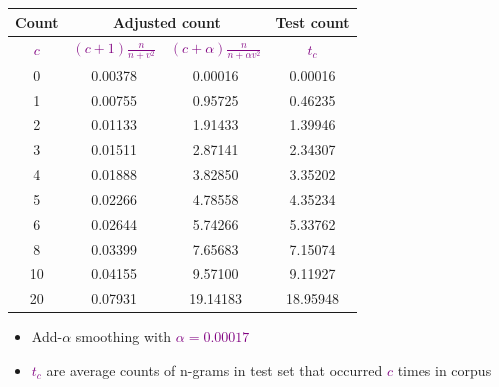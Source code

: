 \documentclass[landscape]{slides}
\newcommand{\maths}[1]{\textcolor{purple}{#1}}
\begin{document}
\vspace{5mm}
\begin{center}
\begin{tabular}{|c|c|c|c|} \hline
\bf Count & \multicolumn{2}{c|}{\bf Adjusted count} & \bf Test count \\ \hline
\maths{$c$} & \maths{$(c+1)\frac{n}{n+v^2}$} & \maths{$(c+\alpha)\frac{n}{n+\alpha v^2}$} & \maths{$t_c$}\\ \hline
  0 &  0.00378 &  0.00016 & 0.00016\\ \hline
  1 &  0.00755 &  0.95725 & 0.46235\\ \hline
  2 &  0.01133 &  1.91433 & 1.39946\\ \hline
  3 &  0.01511 &  2.87141 & 2.34307\\ \hline
  4 &  0.01888 &  3.82850 & 3.35202\\ \hline
  5 &  0.02266 &  4.78558 & 4.35234\\ \hline
  6 &  0.02644 &  5.74266 & 5.33762\\ \hline
  8 &  0.03399 &  7.65683 & 7.15074\\ \hline
 10 &  0.04155 &  9.57100 & 9.11927\\ \hline
 20 &  0.07931 & 19.14183 & 18.95948\\ \hline
\end{tabular}
\end{center}
\begin{itemize}\vspace{-2mm}
\item Add-{$\alpha$} smoothing with \maths{$\alpha=0.00017$}\vspace{-8mm}
\item \maths{$t_c$} are average counts of n-grams in test set that occurred \maths{$c$} times in corpus
\end{itemize}

\end{document}
